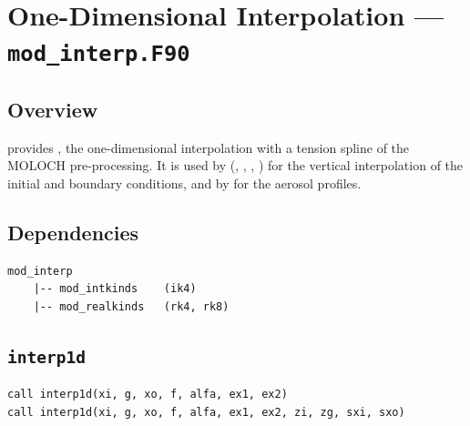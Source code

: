 \section{One-Dimensional Interpolation --- \texttt{mod\_interp.F90}}
\label{sec:interp}

\subsection{Overview}

 provides , the one-dimensional
interpolation with a tension spline of the MOLOCH pre-processing. It is
used by  (, , ,
) for the vertical interpolation of the initial and boundary
conditions, and by  for the aerosol profiles.

\subsection{Dependencies}

\begin{lstlisting}
mod_interp
    |-- mod_intkinds    (ik4)
    |-- mod_realkinds   (rk4, rk8)
\end{lstlisting}

\subsection{\texttt{interp1d}}

\begin{lstlisting}
call interp1d(xi, g, xo, f, alfa, ex1, ex2)
call interp1d(xi, g, xo, f, alfa, ex1, ex2, zi, zg, sxi, sxo)
\end{lstlisting}

